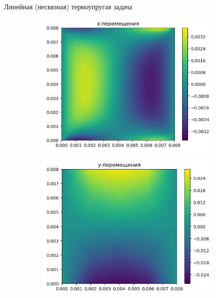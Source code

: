 \documentclass{beamer}
\begin{document}
\begin{frame}{Линейная (несвязная) термоупругая задача}
\begin{figure}[H]
	\centering
	\begin{subfigure}[H]{0.4\textwidth}
		\includegraphics[width=\textwidth]{horiz1}
	\end{subfigure}
	\qquad\qquad
	\begin{subfigure}[H]{0.4\textwidth}
		\includegraphics[width=\textwidth]{vert1}
	\end{subfigure}	
	\begin{subfigure}[H]{0.4\textwidth}

\end{subfigure}
\end{figure}
\end{frame}
\end{document}
